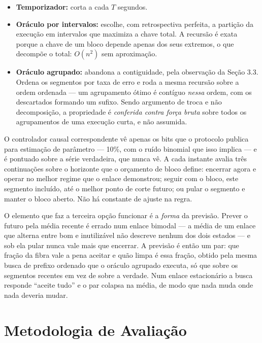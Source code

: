 \documentclass[12pt]{article}
\begin{document}
\begin{itemize}
\item \textbf{Temporizador:} corta a cada $T$ segundos.
\item \textbf{Oráculo por intervalos:} escolhe, com retrospectiva perfeita, a
  partição da execução em intervalos que maximiza a chave total. A recursão é
  exata porque a chave de um bloco depende apenas dos seus extremos, o que
  decompõe o total: $O(n^2)$ sem aproximação.
\item \textbf{Oráculo agrupado:} abandona a contiguidade, pela observação da
  Seção 3.3. Ordena os segmentos por taxa de erro e roda a mesma recursão sobre
  a ordem ordenada --- um agrupamento ótimo é contíguo \emph{nessa} ordem, com
  os descartados formando um sufixo. Sendo argumento de troca e não
  decomposição, a propriedade é \emph{conferida contra força bruta} sobre todos
  os agrupamentos de uma execução curta, e não assumida.
\end{itemize}

O controlador causal correspondente vê apenas os bits que o protocolo publica
para estimação de parâmetro --- 10\%, com o ruído binomial que isso implica --- e
é pontuado sobre a série verdadeira, que nunca vê. A cada instante avalia três
continuações sobre o horizonte que o orçamento de bloco define: encerrar agora e
operar no melhor regime que o enlace demonstrou; seguir com o bloco, este
segmento incluído, até o melhor ponto de corte futuro; ou pular o segmento e
manter o bloco aberto. Não há constante de ajuste na regra.

O elemento que faz a terceira opção funcionar é a \emph{forma} da previsão.
Prever o futuro pela média recente é errado num enlace bimodal --- a média de um
enlace que alterna entre bom e inutilizável não descreve nenhum dos dois estados
--- e sob ela pular nunca vale mais que encerrar. A previsão é então um par: que
fração da fibra vale a pena aceitar e quão limpa é essa fração, obtido pela
mesma busca de prefixo ordenado que o oráculo agrupado executa, só que sobre os
segmentos recentes em vez de sobre a verdade. Num enlace estacionário a busca
responde ``aceite tudo'' e o par colapsa na média, de modo que nada muda onde
nada deveria mudar.

\section{Metodologia de Avaliação}
\end{document}
